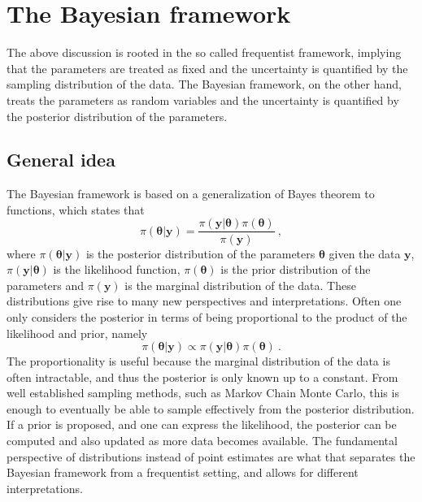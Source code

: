 \section{The Bayesian framework}
The above discussion is rooted in the so called frequentist framework, implying that the parameters are treated as fixed and the uncertainty is quantified by the sampling distribution of the data. The Bayesian framework, on the other hand, treats the parameters as random variables and the uncertainty is quantified by the posterior distribution of the parameters.
\subsection{General idea}
The Bayesian framework is based on a generalization of Bayes theorem \citep[see Proposition 3]{bayes_1763} to functions, which states that 
\begin{equation}
    \pi(\boldsymbol{\theta} \lvert \mathbf{y}) = \frac{\pi(\mathbf{y} \lvert \boldsymbol{\theta})\pi(\boldsymbol{\theta})}{\pi(\mathbf{y})} \ ,
\end{equation}
where $\pi(\boldsymbol{\theta} \lvert \mathbf{y})$ is the posterior distribution of the parameters $\boldsymbol{\theta}$ given the data $\mathbf{y}$, $\pi(\mathbf{y} \lvert \boldsymbol{\theta})$ is the likelihood function, $\pi(\boldsymbol{\theta})$ is the prior distribution of the parameters and $\pi(\mathbf{y})$ is the marginal distribution of the data. 
These distributions give rise to many new perspectives and interpretations. Often one only considers the posterior in terms of being proportional to the product of the likelihood and prior, namely
\begin{equation}
    \pi(\boldsymbol{\theta} \lvert \mathbf{y}) \propto \pi(\mathbf{y} \lvert \boldsymbol{\theta})\pi(\boldsymbol{\theta}) \ .
\end{equation}
The proportionality is useful because the marginal distribution of the data is often intractable, and thus the posterior is only known up to a constant.
From well established sampling methods, such as Markov Chain Monte Carlo, this is enough to eventually be able to sample effectively from the posterior distribution. If a prior is proposed, and one can express the likelihood, the posterior can be computed and also updated as more data becomes available. 
\newline
\newline
The fundamental perspective of distributions instead of point estimates are what that separates the Bayesian framework from a frequentist setting, and allows for different interpretations.
